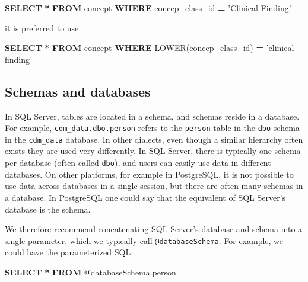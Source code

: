 \documentclass[
]{article}
\newenvironment{Shaded}{\begin{snugshade}}{\end{snugshade}}
\newcommand{\FunctionTok}[1]{\textcolor[rgb]{0.00,0.00,0.00}{#1}}
\newcommand{\KeywordTok}[1]{\textcolor[rgb]{0.13,0.29,0.53}{\textbf{#1}}}
\newcommand{\NormalTok}[1]{#1}
\newcommand{\OperatorTok}[1]{\textcolor[rgb]{0.81,0.36,0.00}{\textbf{#1}}}
\newcommand{\StringTok}[1]{\textcolor[rgb]{0.31,0.60,0.02}{#1}}
\begin{document}
\begin{Shaded}
\begin{Highlighting}[]
\KeywordTok{SELECT} \OperatorTok{*} \KeywordTok{FROM}\NormalTok{ concept }\KeywordTok{WHERE}\NormalTok{ concep_class_id }\OperatorTok{=} \StringTok{'Clinical Finding'}
\end{Highlighting}
\end{Shaded}

it is preferred to use

\begin{Shaded}
\begin{Highlighting}[]
\KeywordTok{SELECT} \OperatorTok{*} \KeywordTok{FROM}\NormalTok{ concept }\KeywordTok{WHERE} \FunctionTok{LOWER}\NormalTok{(concep_class_id) }\OperatorTok{=} \StringTok{'clinical finding'}
\end{Highlighting}
\end{Shaded}

\hypertarget{schemas-and-databases}{%
\subsection{Schemas and databases}\label{schemas-and-databases}}

In SQL Server, tables are located in a schema, and schemas reside in a
database. For example, \texttt{cdm\_data.dbo.person} refers to the
\texttt{person} table in the \texttt{dbo} schema in the
\texttt{cdm\_data} database. In other dialects, even though a similar
hierarchy often exists they are used very differently. In SQL Server,
there is typically one schema per database (often called \texttt{dbo}),
and users can easily use data in different databases. On other
platforms, for example in PostgreSQL, it is not possible to use data
across databases in a single session, but there are often many schemas
in a database. In PostgreSQL one could say that the equivalent of SQL
Server's database is the schema.

We therefore recommend concatenating SQL Server's database and schema
into a single parameter, which we typically call
\texttt{@databaseSchema}. For example, we could have the parameterized
SQL

\begin{Shaded}
\begin{Highlighting}[]
\KeywordTok{SELECT} \OperatorTok{*} \KeywordTok{FROM}\NormalTok{ @databaseSchema.person}
\end{Highlighting}
\end{Shaded}
\end{document}
